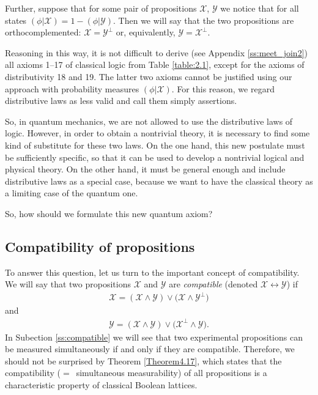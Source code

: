 \documentclass[nochecklpage]{stefan1}
\theoremstyle{definition}
\begin{document}
Further, suppose that for some pair of propositions $ \mathcal{X} $,
$ \mathcal{Y} $ we notice that for all states $ (\phi | \mathcal{X}) =
1 - (\phi | \mathcal{Y}) $. Then we will say that the two propositions
are orthocomplemented: $ \mathcal{X} = \mathcal{Y}^{\perp } $ or,
equivalently, $ \mathcal{Y} = \mathcal{X}^{\perp } $.

Reasoning in this way, it is not difficult to derive (see Appendix
\ref{ss:meet_join2}) all axioms 1--17 of classical logic from Table
\ref{table:2.1}, except for the axioms of distributivity 18 and 19. The
latter two axioms cannot be justified using our approach with
probability measures $ (\phi | \mathcal{X}) $. For this reason, we
regard distributive laws as less valid and call them simply assertions.

So, in quantum mechanics, we are not allowed to use the distributive
laws of logic. However, in order to obtain a nontrivial theory, it is
necessary to find some kind of substitute for these two laws. On the one
hand, this new postulate must be sufficiently specific, so that it can
be used to develop a nontrivial logical and physical theory. On the
other hand, it must be general enough and include distributive laws as
a special case, because we want to have the classical theory as a
limiting case of the quantum one.

So, how should we formulate this new quantum axiom?

\vspace*{-3.5pt}\subsection{Compatibility of propositions}\label{ss:compatibility}
\vspace*{-3.5pt}
To answer this question, let us turn to the important concept of
compatibility. We will say that two propositions $ \mathcal{X} $ and
$ \mathcal{Y} $ are \emph{compatible} (denoted
$ \mathcal{X}\leftrightarrow \mathcal{Y} $)
\label{lb:compatibility}
if
%
\begin{align}
\mathcal{X} = (\mathcal{X} \wedge \mathcal{Y}) \vee \bigl( \mathcal{X} \wedge
\mathcal{Y}^{\perp } \bigr) \label{eq:compat1}
\end{align}
%
and\vspace*{-6pt}
%
\begin{align}
\mathcal{Y} = (\mathcal{X} \wedge \mathcal{Y}) \vee \bigl( \mathcal{X}
^{\perp } \wedge \mathcal{Y} \bigr) . \label{eq:compat2}
\end{align}
%
In Subection \ref{ss:compatible} we will see that two experimental
propositions can be measured simultaneously if and only if they are
compatible. Therefore, we should not be surprised by Theorem
\ref{Theorem4.17}, which states that the compatibility ($=$~simultaneous
measurability) of all propositions is a characteristic property of
classical Boolean lattices.
\end{document}
